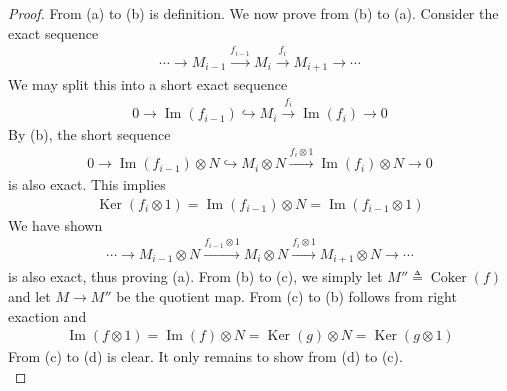 \documentclass{report}
\begin{document}
\begin{proof}
From (a) to (b) is definition. We now prove from (b) to (a). Consider the exact sequence  
\begin{align*}
\cdots \rightarrow M_{i-1} \overset{f_{i-1}}{\longrightarrow } M_i \overset{f_i}{\longrightarrow }M_{i+1}\rightarrow \cdots
\end{align*}
We may split this into a short exact sequence 
\begin{align*}
0\longrightarrow  \operatorname{Im}(f_{i-1})\hookrightarrow M_i \overset{f_i}{\longrightarrow }\operatorname{Im}(f_i)\longrightarrow 0
\end{align*}
By (b), the short sequence
\begin{align*}
0\longrightarrow \operatorname{Im}(f_{i-1})\otimes  N \hookrightarrow M_i \otimes  N \overset{f_i\otimes 1}{\longrightarrow }\operatorname{Im}(f_i)\otimes  N \longrightarrow 0 
\end{align*}
is also exact. This implies 
\begin{align*}
\operatorname{Ker}(f_i\otimes  1)=\operatorname{Im}(f_{i-1})\otimes N=\operatorname{Im}(f_{i-1}\otimes  1)
\end{align*}
We have shown 
\begin{align*}
\cdots \rightarrow M_{i-1} \otimes  N \overset{f_{i-1}\otimes  1}{\longrightarrow } M_i \otimes  N \overset{f_i\otimes  1}{\longrightarrow }M_{i+1}\otimes  N\rightarrow \cdots
\end{align*}
is also exact, thus proving (a). From (b) to (c), we simply let $M''\triangleq \operatorname{Coker}(f)$ and let  $M\rightarrow M''$ be the quotient map. From (c) to (b) follows from right exaction and 
\begin{align*}
\operatorname{Im}(f\otimes 1)=\operatorname{Im}(f)\otimes  N = \operatorname{Ker}(g)\otimes N= \operatorname{Ker}(g\otimes 1) 
\end{align*}
From (c) to (d) is clear. It only remains to show from  (d) to (c). \\


\end{proof}
\end{document}
